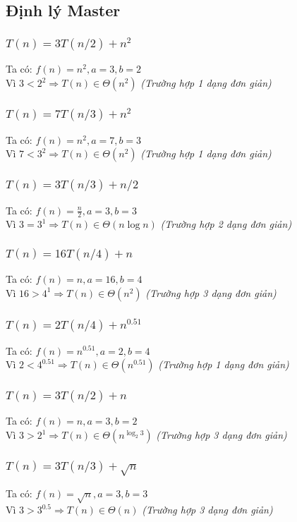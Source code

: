 \subsection{Định lý Master}
\subsubsection{$T(n) = 3T(n/2) + n^2$}
Ta có: $f(n) = n^2, a = 3, b = 2$\\
Vì $3 < 2^2 \Rightarrow T(n) \in \Theta(n^2)$ \textit{(Trường hợp 1 dạng đơn giản)}
\subsubsection{$T(n) = 7T(n/3) + n^2$}
Ta có: $f(n) = n^2, a=7,b=3$\\
Vì $7 < 3^2 \Rightarrow T(n) \in \Theta(n^2)$ \textit{(Trường hợp 1 dạng đơn giản)}
\subsubsection{$T(n) = 3T(n/3) + n/2$}
Ta có: $f(n) = \frac{n}{2}, a=3,b=3$\\
Vì $3 = 3^1 \Rightarrow T(n) \in \Theta(n\log n)$ \textit{(Trường hợp 2 dạng đơn giản)}
\subsubsection{$T(n) = 16T(n/4) + n$}
Ta có: $f(n) = n, a=16,b=4$\\
Vì $16 > 4^1 \Rightarrow T(n) \in \Theta(n^2)$ \textit{(Trường hợp 3 dạng đơn giản)}
\subsubsection{$T(n) = 2T(n/4) + n^{0.51}$}
Ta có: $f(n) = n^{0.51}, a=2,b=4$\\
Vì $2 < 4^{0.51} \Rightarrow T(n) \in \Theta(n^{0.51})$ \textit{(Trường hợp 1 dạng đơn giản)}
\subsubsection{$T(n) = 3T(n/2) + n$}
Ta có: $f(n) = n, a=3,b=2$\\
Vì $3 > 2^1 \Rightarrow T(n) \in \Theta(n^{\log_2 3})$ \textit{(Trường hợp 3 dạng đơn giản)}
\subsubsection{$T(n) = 3T(n/3) +\sqrt{n}$}
Ta có: $f(n) = \sqrt{n}, a=3,b=3$\\
Vì $3 > 3^{0.5} \Rightarrow T(n) \in \Theta(n)$ \textit{(Trường hợp 3 dạng đơn giản)}
